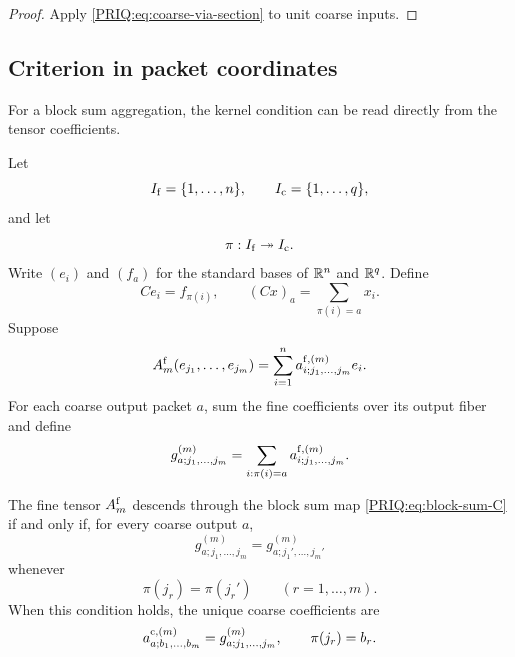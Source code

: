 \begin{proof}
Apply \eqref{PRIQ:eq:coarse-via-section} to unit coarse inputs.
\end{proof}

\subsection{Criterion in packet coordinates}
For a block sum aggregation, the kernel condition can be read directly from the tensor coefficients.

Let
\[
  I_{\mathrm f}=\{1,\ldots,n\},
  \qquad
  I_{\mathrm c}=\{1,\ldots,q\},
\]
and let
\[
  \pi:I_{\mathrm f}\twoheadrightarrow I_{\mathrm c}.
\]
Write $(e_i)$ and $(f_a)$ for the standard bases of $\mathbb R^n$ and $\mathbb R^q$.  Define
\begin{equation}\label{PRIQ:eq:block-sum-C}
  Ce_i=f_{\pi(i)},
  \qquad
  (Cx)_a=\sum_{\pi(i)=a}x_i.
\end{equation}
Suppose
\begin{equation}\label{PRIQ:eq:fine-coordinates}
  A_m^{\mathrm f}(e_{j_1},\ldots,e_{j_m})
  =
  \sum_{i=1}^n
  a^{\mathrm f,(m)}_{i;j_1,\ldots,j_m}e_i.
\end{equation}
For each coarse output packet $a$, sum the fine coefficients over its output fiber and define
\begin{equation}\label{PRIQ:eq:aggregated-coefficient}
  g^{(m)}_{a;j_1,\ldots,j_m}
  =
  \sum_{i:\pi(i)=a}
  a^{\mathrm f,(m)}_{i;j_1,\ldots,j_m}.
\end{equation}

\begin{PRIQtheorem}\label{PRIQ:thm:packet-coordinate-criterion}
The fine tensor $A_m^{\mathrm f}$ descends through the block sum map \eqref{PRIQ:eq:block-sum-C} if and only if, for every coarse output $a$,
\begin{equation}\label{PRIQ:eq:packet-fiber-constancy}
  g^{(m)}_{a;j_1,\ldots,j_m}
  =
  g^{(m)}_{a;j_1',\ldots,j_m'}
\end{equation}
whenever
\[
  \pi(j_r)=\pi(j_r')
  \qquad(r=1,\ldots,m).
\]
When this condition holds, the unique coarse coefficients are
\begin{equation}\label{PRIQ:eq:coarse-coordinate-formula}
  a^{\mathrm c,(m)}_{a;b_1,\ldots,b_m}
  =
  g^{(m)}_{a;j_1,\ldots,j_m},
  \qquad
  \pi(j_r)=b_r.
\end{equation}
\end{PRIQtheorem}


